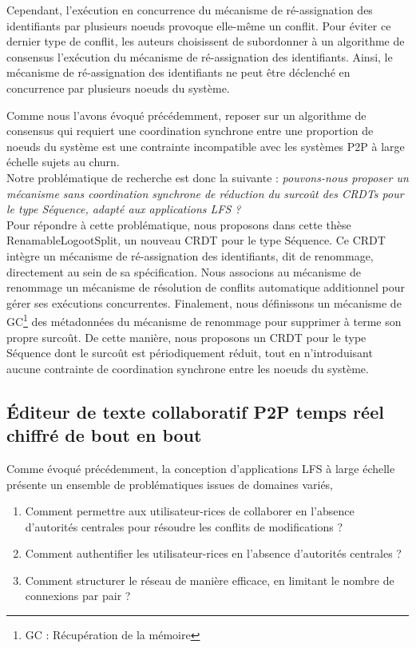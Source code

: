 Cependant, l'exécution en concurrence du mécanisme de ré-assignation des identifiants par plusieurs noeuds provoque elle-même un conflit.
Pour éviter ce dernier type de conflit, les auteurs choisissent de subordonner à un algorithme de consensus l'exécution du mécanisme de ré-assignation des identifiants.
Ainsi, le mécanisme de ré-assignation des identifiants ne peut être déclenché en concurrence par plusieurs noeuds du système.

Comme nous l'avons évoqué précédemment, reposer sur un algorithme de consensus qui requiert une coordination synchrone entre une proportion de noeuds du système est une contrainte incompatible avec les systèmes \ac{P2P} à large échelle sujets au churn.\\

Notre problématique de recherche est donc la suivante : \emph{pouvons-nous proposer un mécanisme sans coordination synchrone de réduction du surcoût des \acp{CRDT} pour le type Séquence, \ie adapté aux applications \ac{LFS} ?}\\

Pour répondre à cette problématique, nous proposons dans cette thèse RenamableLogootSplit, un nouveau \ac{CRDT} pour le type Séquence.
Ce \ac{CRDT} intègre un mécanisme de ré-assignation des identifiants, dit de renommage, directement au sein de sa spécification.
Nous associons au mécanisme de renommage un mécanisme de résolution de conflits automatique additionnel pour gérer ses exécutions concurrentes.
Finalement, nous définissons un mécanisme de \acf{GC}\footnote{\acf{GC} : Récupération de la mémoire} des métadonnées du mécanisme de renommage pour supprimer à terme son propre surcoût.
De cette manière, nous proposons un \ac{CRDT} pour le type Séquence dont le surcoût est périodiquement réduit, tout en n'introduisant aucune contrainte de coordination synchrone entre les noeuds du système.

\subsection{Éditeur de texte collaboratif \ac{P2P} temps réel chiffré de bout en bout}
\label{sec:research-questions-mute}

Comme évoqué précédemment, la conception d'applications \ac{LFS} à large échelle présente un ensemble de problématiques issues de domaines variés, \eg
\begin{enumerate}
    \item Comment permettre aux utilisateur-rices de collaborer en l'absence d'autorités centrales pour résoudre les conflits de modifications ?
    \item Comment authentifier les utilisateur-rices en l'absence d'autorités centrales ?
    \item Comment structurer le réseau de manière efficace, \ie en limitant le nombre de connexions par pair ?
\end{enumerate}

